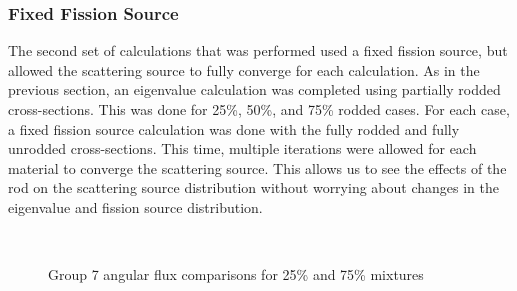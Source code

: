 \subsubsection{Fixed Fission Source}

The second set of calculations that was performed used a fixed fission source, but allowed the scattering source to fully converge for each calculation.  As in the previous section, an eigenvalue calculation was completed using partially rodded cross-sections.  This was done for 25\%, 50\%, and 75\% rodded cases.  For each case, a fixed fission source calculation was done with the fully rodded and fully unrodded cross-sections.  This time, multiple iterations were allowed for each material to converge the scattering source.  This allows us to see the effects of the rod on the scattering source distribution without worrying about changes in the eigenvalue and fission source distribution.

\begin{figure}[h]
  \centering
  ~
  ~
  \caption{Group 7 angular flux comparisons for 25\% and 75\% mixtures}\label{f:1dmoc-angflux7}
\end{figure}

